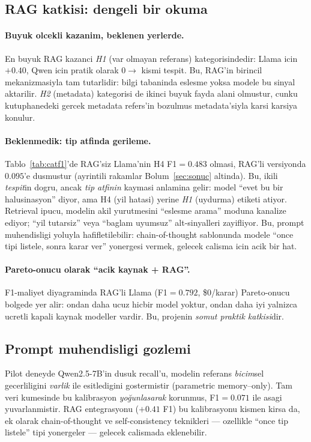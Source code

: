 \documentclass[11pt,a4paper]{article}
\begin{document}
\subsection{RAG katkisi: dengeli bir okuma}
\paragraph{Buyuk olcekli kazanim, beklenen yerlerde.} En buyuk RAG kazanci
\emph{H1} (var olmayan referans) kategorisindedir: Llama icin $+0.40$,
Qwen icin pratik olarak $0 \to$ kismi tespit. Bu, RAG'in birincil
mekanizmasiyla tam tutarlidir: bilgi tabaninda eslesme yoksa modele bu
sinyal aktarilir. \emph{H2} (metadata) kategorisi de ikinci buyuk fayda
alani olmustur, cunku kutuphanedeki gercek metadata refers'in bozulmus
metadata'siyla karsi karsiya konulur.

\paragraph{Beklenmedik: tip atfinda gerileme.} Tablo~\ref{tab:catf1}'de
RAG'siz Llama'nin H4 F1$=0.483$ olmasi, RAG'li versiyonda $0.095$'e
dusmustur (ayrintili rakamlar Bolum~\ref{sec:sonuc} altinda). Bu, ikili
\emph{tespit}in dogru, ancak \emph{tip atfinin} kaymasi anlamina gelir:
model ``evet bu bir halusinasyon'' diyor, ama H4 (yil hatasi) yerine
\emph{H1} (uydurma) etiketi atiyor. Retrieval ipucu, modelin akil yurutmesini
``eslesme arama'' moduna kanalize ediyor; ``yil tutarsiz'' veya ``baglam
uyumsuz'' alt-sinyalleri zayifliyor. Bu, prompt muhendisligi yoluyla
hafifletilebilir: chain-of-thought \cite{wei2022cot} sablonunda modele
``once tipi listele, sonra karar ver'' yonergesi vermek, gelecek calisma
icin acik bir hat.

\paragraph{Pareto-onucu olarak ``acik kaynak + RAG''.} F1-maliyet
diyagraminda RAG'li Llama (F1$=0.792$, \$0/karar) Pareto-onucu bolgede
yer alir: ondan daha ucuz hicbir model yoktur, ondan daha iyi yalnizca
ucretli kapali kaynak modeller vardir. Bu, projenin \emph{somut praktik
katkisi}dir.

\subsection{Prompt muhendisligi gozlemi}
Pilot deneyde Qwen2.5-7B'in dusuk recall'u, modelin referans
\emph{bicim}sel gecerliligini \emph{varlik} ile esitledigini gostermistir
(parametric memory--only). Tam veri kumesinde bu kalibrasyon \emph{yo\u
gunlasarak} korunmus, F1$=0.071$ ile asagi yuvarlanmistir. RAG entegrasyonu
($+0.41$ F1) bu kalibrasyonu kismen kirsa da, ek olarak chain-of-thought
\cite{wei2022cot} ve self-consistency \cite{wang2023selfconsistency}
teknikleri --- ozellikle ``once tip listele'' tipi yonergeler --- gelecek
calismada eklenebilir.
\end{document}
